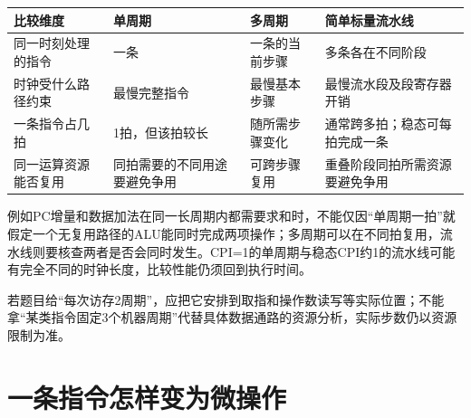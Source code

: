 \begin{wideblock}

\par\medskip\noindent\begin{minipage}{\linewidth}\fontsize{9.3}{12}\selectfont\begin{tabularx}{\linewidth}{@{}YYYY@{}}
\toprule\noalign{}
\begin{minipage}[b]{\linewidth}\raggedright
比较维度
\end{minipage} & \begin{minipage}[b]{\linewidth}\raggedright
单周期
\end{minipage} & \begin{minipage}[b]{\linewidth}\raggedright
多周期
\end{minipage} & \begin{minipage}[b]{\linewidth}\raggedright
简单标量流水线
\end{minipage} \\
\midrule\noalign{}


同一时刻处理的指令 & 一条 & 一条的当前步骤 & 多条各在不同阶段 \\
时钟受什么路径约束 & 最慢完整指令 & 最慢基本步骤 & 最慢流水段及段寄存器开销 \\
一条指令占几拍 & 1拍，但该拍较长 & 随所需步骤变化 & 通常跨多拍；稳态可每拍完成一条 \\
同一运算资源能否复用 & 同拍需要的不同用途要避免争用 & 可跨步骤复用 & 重叠阶段同拍所需资源要避免争用 \\
\bottomrule\end{tabularx}
\end{minipage}\par\medskip

\end{wideblock}

例如PC增量和数据加法在同一长周期内都需要求和时，不能仅因``单周期一拍''就假定一个无复用路径的ALU能同时完成两项操作；多周期可以在不同拍复用，流水线则要核查两者是否会同时发生。CPI=1的单周期与稳态CPI约1的流水线可能有完全不同的时钟长度，比较性能仍须回到执行时间。

若题目给``每次访存2周期''，应把它安排到取指和操作数读写等实际位置；不能拿``某类指令固定3个机器周期''代替具体数据通路的资源分析，实际步数仍以资源限制为准。

\section{一条指令怎样变为微操作}\label{CO05-datapath}

